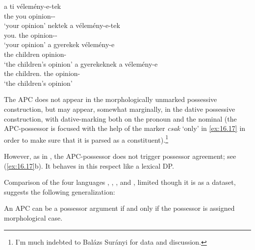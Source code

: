 \documentclass[output=paper]{langsci/langscibook}
\begin{document}
\ea\label{ex:16.16}
	\ea
		\gll a    ti    vélemény-e-tek\\
			the you opinion-\Poss-\Spl{}\\
		\glt    `your opinion'
	\ex
		\gll nektek    a    vélemény-e-tek\\
			you.\Dat{} the opinion-\Poss-\Spl{}\\
		\glt    `your opinion'
	\ex
		\gll a    gyerekek  vélemény-e\\
			the children  opinion-\Poss{}\\
		\glt    `the children's opinion'
	\ex
		\gll a    gyerekeknek    a    vélemény-e\\
			the children.\Dat{} the opinion-\Poss{}\\
		\glt    `the children's opinion'
	\z
\z

The \gls{APC} does not appear in the morphologically unmarked \Nom{} possessive
construction, but may appear, somewhat marginally, in the dative possessive
construction, with dative-marking both on the pronoun and the nominal (the
APC-possessor is focused with the help of the  marker \emph{csak} ‘only’
in \eqref{ex:16.17} in order to make sure that it is parsed as a constituent).\footnote{
I’m much indebted to Balázs Surányi for data and discussion.}\largerpage[2]

\ea\label{ex:16.17}
	\z
\z

However, as in , the APC-possessor does not trigger possessor agreement;
see (\ref{ex:16.17}b). It behaves in this respect like a lexical DP.

Comparison of the four languages , , , and ,
limited though it is as a dataset, suggests the following generalization:

\ea\label{ex:16.18}
    An \gls{APC} can be a possessor argument if and only if the possessor is
    assigned morphological case.
\z
\end{document}
